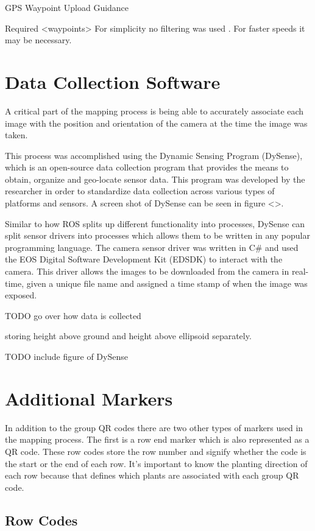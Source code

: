 GPS
Waypoint Upload
Guidance

Required <waypoints>
For simplicity no filtering was used . For faster speeds it may be necessary.

\section{Data Collection Software}
\label{system-software}

A critical part of the mapping process is being able to accurately associate each image with the position and orientation of the camera at the time the image was taken.  

This process was accomplished using the Dynamic Sensing Program (DySense), which is an open-source data collection program that provides the means to obtain, organize and geo-locate sensor data.  This program was developed by the researcher in order to standardize data collection across various types of platforms and sensors.  A screen shot of DySense can be seen in figure <>.

Similar to how ROS splits up different functionality into processes, DySense can split sensor drivers into processes which allows them to be written in any popular programming language.  The camera sensor driver was written in C# and used the EOS Digital Software Development Kit (EDSDK) to interact with the camera.  This driver allows the images to be downloaded from the camera in real-time, given a unique file name and assigned a time stamp of when the image was exposed.

TODO go over how data is collected

storing height above ground and height above ellipsoid separately.   

TODO include figure of DySense

\section{Additional Markers}
\label{system-markers}

In addition to the group QR codes there are two other types of markers used in the mapping process.  The first is a row end marker which is also represented as a QR code.  These row codes store the row number and signify whether the code is the start or the end of each row.  It's important to know the planting direction of each row because that defines which plants are associated with each group QR code.   

\subsection{Row Codes}

